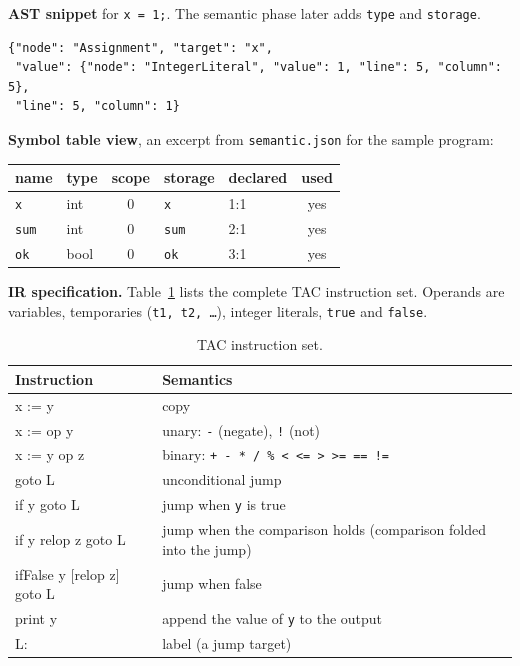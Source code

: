 \documentclass[11pt,letterpaper]{article}
\newcommand{\code}[1]{\texttt{#1}}
\begin{document}
\textbf{AST snippet} for \code{x = 1;}. The semantic phase later adds \code{type} and \code{storage}.
\begin{lstlisting}
{"node": "Assignment", "target": "x",
 "value": {"node": "IntegerLiteral", "value": 1, "line": 5, "column": 5},
 "line": 5, "column": 1}
\end{lstlisting}

\textbf{Symbol table view}, an excerpt from \code{semantic.json} for the sample program:
\begin{center}\small
\begin{tabular}{llcllc}
\toprule
\textbf{name} & \textbf{type} & \textbf{scope} & \textbf{storage} & \textbf{declared} & \textbf{used} \\
\midrule
\code{x} & int & 0 & \code{x} & 1:1 & yes \\
\code{sum} & int & 0 & \code{sum} & 2:1 & yes \\
\code{ok} & bool & 0 & \code{ok} & 3:1 & yes \\
\bottomrule
\end{tabular}
\end{center}

\textbf{IR specification.} Table~\ref{tab:tac} lists the complete TAC instruction set. Operands are variables, temporaries (\code{t1, t2, \ldots}), integer literals, \code{true} and \code{false}.

\begin{table}[H]
\centering\small
\begin{tabularx}{0.92\linewidth}{>{\ttfamily}l X}
\toprule
\textrm{\textbf{Instruction}} & \textbf{Semantics} \\
\midrule
x := y & copy \\
x := op y & unary: \code{-} (negate), \code{!} (not) \\
x := y op z & binary: \code{+ - * / \% < <= > >= == !=} \\
goto L & unconditional jump \\
if y goto L & jump when \code{y} is true \\
if y relop z goto L & jump when the comparison holds (comparison folded into the jump) \\
ifFalse y [relop z] goto L & jump when false \\
print y & append the value of \code{y} to the output \\
L: & label (a jump target) \\
\bottomrule
\end{tabularx}
\caption{TAC instruction set.}
\label{tab:tac}
\end{table}
\end{document}
